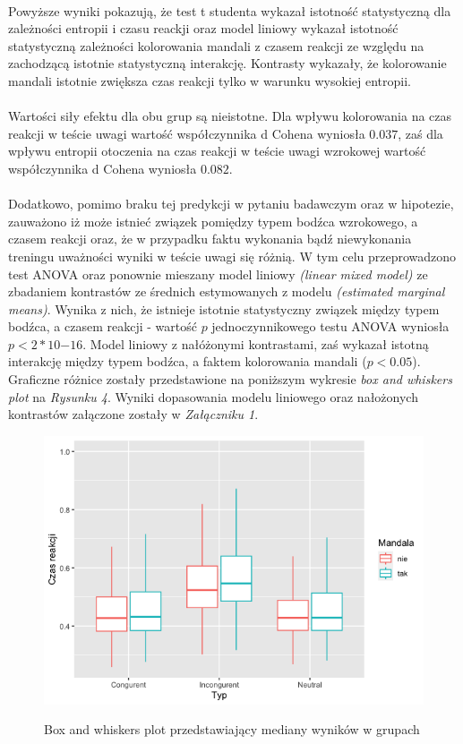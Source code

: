 \documentclass[12pt,a4paper,final,oneside,onecolumn,titlepage]{article}
\begin{document}
\paragraph{}
Powyższe wyniki pokazują, że test t studenta wykazał istotność statystyczną dla zależności entropii i czasu reackji oraz model liniowy wykazał istotność statystyczną zależności kolorowania mandali z czasem reakcji ze względu na zachodzącą istotnie statystyczną interakcję. Kontrasty wykazały, że kolorowanie mandali istotnie zwiększa czas reakcji tylko w warunku wysokiej entropii.
\paragraph{}
Wartości siły efektu dla obu grup są nieistotne. Dla wpływu kolorowania na czas reakcji w teście uwagi wartość współczynnika d Cohena wyniosła $0.037$, zaś dla wpływu entropii otoczenia na czas reakcji w teście uwagi wzrokowej wartość współczynnika d Cohena wyniosła $0.082$.
\paragraph{}
Dodatkowo, pomimo braku tej predykcji w pytaniu badawczym oraz w hipotezie, zauważono iż może istnieć związek pomiędzy typem bodźca wzrokowego, a czasem reakcji oraz, że w przypadku faktu wykonania bądź niewykonania treningu uważności wyniki w teście uwagi się różnią. W tym celu przeprowadzono test ANOVA oraz ponownie mieszany model liniowy \textit{(linear mixed model)} ze zbadaniem kontrastów ze średnich estymowanych z modelu \textit{(estimated marginal means)}. Wynika z nich, że istnieje istotnie statystyczny związek między typem bodźca, a czasem reakcji - wartość $p$ jednoczynnikowego testu ANOVA wyniosła $p<2*10{-16}$. Model liniowy z nałóżonymi kontrastami, zaś wykazał istotną interakcję między typem bodźca, a faktem kolorowania mandali ($p<0.05$). Graficzne różnice zostały przedstawione na poniższym wykresie \textit{box and whiskers plot} na \textit{Rysunku 4}. Wyniki dopasowania modelu liniowego oraz nałożonych kontrastów załączone zostały w \textit{Załączniku 1}.
\begin{figure}[H]
\centering
\caption{Box and whiskers plot przedstawiający mediany wyników w grupach}
\includegraphics[scale=0.5]{box2}
\label{Rysunek}
\end{figure}
\end{document}
